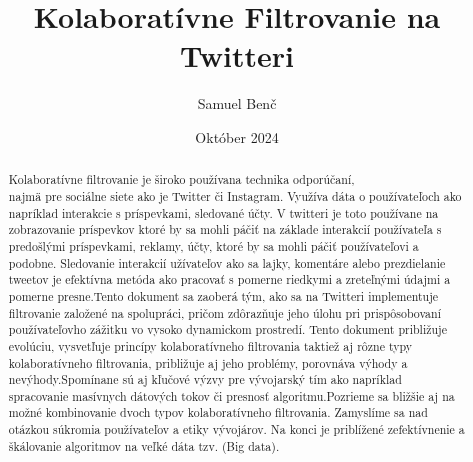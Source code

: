 \documentclass{article}
\title{Kolaboratívne Filtrovanie na Twitteri}
\author{Samuel Benč}
\date{Október 2024}
\begin{document}
\maketitle
\begin{abstract}
Kolaboratívne filtrovanie je široko používana technika odporúčaní, \\ najmä pre sociálne siete ako je Twitter či Instagram. Využíva dáta o používateľoch ako napríklad interakcie s príspevkami, sledované účty. V twitteri je toto používane na zobrazovanie príspevkov ktoré by sa mohli páčiť na základe interakcií používateľa s predošlými príspevkami, reklamy, účty, ktoré by sa mohli páčiť používateľovi a podobne. Sledovanie interakcií užívateľov ako sa lajky, komentáre alebo prezdielanie tweetov je efektívna metóda ako pracovať s pomerne riedkymi a zreteľnými údajmi a pomerne presne.Tento dokument sa zaoberá tým, ako sa na Twitteri implementuje filtrovanie založené na spolupráci, pričom
zdôrazňuje jeho úlohu pri prispôsobovaní používateľovho zážitku vo vysoko dynamickom prostredí. Tento dokument približuje evolúciu, vysvetľuje princípy kolaboratívneho filtrovania taktiež aj rôzne typy kolaboratívneho filtrovania, približuje aj jeho problémy, porovnáva výhody a nevýhody.Spomínane sú aj kľučové výzvy pre vývojarský tím ako napríklad spracovanie masívnych dátových tokov či presnosť algoritmu.Pozrieme sa bližšie aj na možné kombinovanie dvoch typov kolaboratívneho filtrovania. Zamyslíme sa nad otázkou súkromia používateľov a etiky vývojárov. Na konci je priblížené zefektívnenie a škálovanie algoritmov na veľké dáta tzv. (Big data).
\end{abstract}

\end{document}
